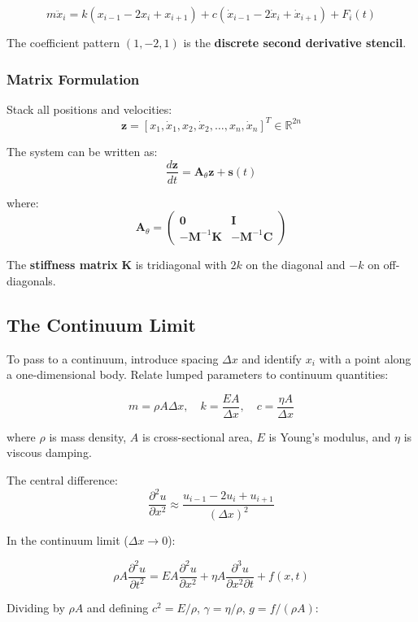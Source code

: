 \documentclass[
]{article}
\begin{document}
\[m\ddot{x}_i = k(x_{i-1} - 2x_i + x_{i+1}) + c(\dot{x}_{i-1} - 2\dot{x}_i + \dot{x}_{i+1}) + F_i(t)\]

The coefficient pattern \((1, -2, 1)\) is the \textbf{discrete second
derivative stencil}.

\subsubsection{Matrix Formulation}\label{matrix-formulation}

Stack all positions and velocities:
\[\mathbf{z} = [x_1, \dot{x}_1, x_2, \dot{x}_2, \ldots, x_n, \dot{x}_n]^T \in \mathbb{R}^{2n}\]

The system can be written as:
\[\frac{d\mathbf{z}}{dt} = \mathbf{A}_\theta \mathbf{z} + \mathbf{s}(t)\]

where:
\[\mathbf{A}_\theta = \begin{pmatrix} \mathbf{0} & \mathbf{I} \\ -\mathbf{M}^{-1}\mathbf{K} & -\mathbf{M}^{-1}\mathbf{C} \end{pmatrix}\]

The \textbf{stiffness matrix} \(\mathbf{K}\) is tridiagonal with \(2k\)
on the diagonal and \(-k\) on off-diagonals.

\subsection{The Continuum Limit}\label{the-continuum-limit}

To pass to a continuum, introduce spacing \(\Delta x\) and identify
\(x_i\) with a point along a one-dimensional body. Relate lumped
parameters to continuum quantities:

\[m = \rho A \Delta x, \quad k = \frac{EA}{\Delta x}, \quad c = \frac{\eta A}{\Delta x}\]

where \(\rho\) is mass density, \(A\) is cross-sectional area, \(E\) is
Young's modulus, and \(\eta\) is viscous damping.

The central difference:
\[\frac{\partial^2 u}{\partial x^2} \approx \frac{u_{i-1} - 2u_i + u_{i+1}}{(\Delta x)^2}\]

In the continuum limit (\(\Delta x \to 0\)):

\[\rho A \frac{\partial^2 u}{\partial t^2} = EA \frac{\partial^2 u}{\partial x^2} + \eta A \frac{\partial^3 u}{\partial x^2 \partial t} + f(x,t)\]

Dividing by \(\rho A\) and defining \(c^2 = E/\rho\),
\(\gamma = \eta/\rho\), \(g = f/(\rho A)\):
\end{document}
